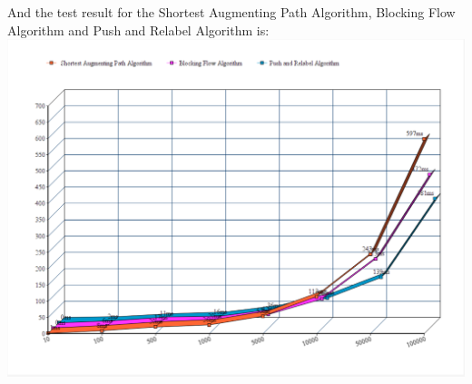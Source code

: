 \documentclass[twocolumn,9pt]{extarticle}
\begin{document}
And the test result for the Shortest Augmenting Path Algorithm, Blocking Flow Algorithm and Push and Relabel Algorithm is:
\includegraphics[scale=0.22]{test}
\end{document}
